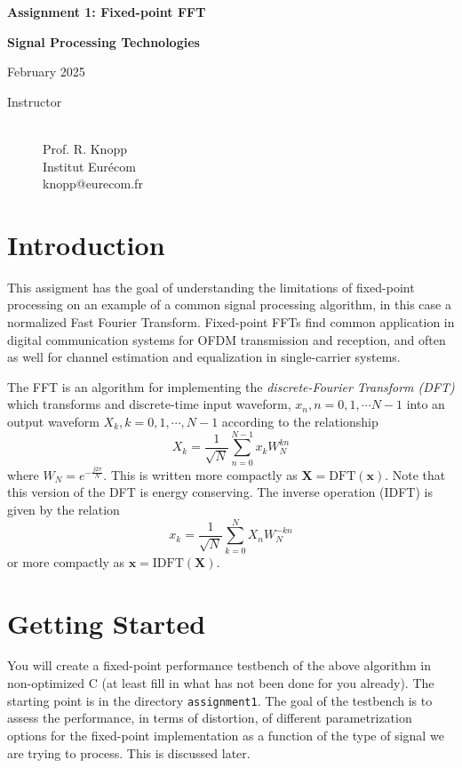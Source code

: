 \documentclass[11pt]{article}
\begin{document}
\parindent 0cm
\centerline{\Large\bf Assignment 1: Fixed-point FFT}
\centerline{\Large\bf Signal Processing Technologies}
\centerline{\large February 2025}
\makeatletter
\begin{description}
\item[Instructor] \mbox{}\\
Prof. R. Knopp\\
Institut Eur\'ecom\\
knopp@eurecom.fr
\end{description}
\section{Introduction}
This assigment has the goal of understanding the limitations of fixed-point processing on an 
example of a common signal processing algorithm, in this case a normalized Fast Fourier Transform.
Fixed-point FFTs find common application in digital communication systems for OFDM transmission and
reception, and often as well for channel estimation and equalization in single-carrier systems. 

The FFT is an algorithm for implementing the {\em discrete-Fourier Transform (DFT)} which transforms
and discrete-time input waveform, $x_{n}, n=0,1,\cdots N-1$ into an output waveform $X_{k}, k=0,1,\cdots,N-1$
according to the relationship
\begin{equation}
X_{k} = \frac{1}{\sqrt{N}}\sum_{n=0}^{N-1}x_{k}W_{N}^{kn}
\end{equation}
where $W_{N} = e^{-\frac{j2\pi}{N}}$.  This is written more compactly as $\mathbf{X} = \mathrm{DFT}(\mathbf{x})$. 
Note that this version of the DFT is energy conserving.  The inverse operation (IDFT) is given by the relation
\begin{equation}
x_{k} = \frac{1}{\sqrt{N}}\sum_{k=0}^{N}X_{n}W_{N}^{-kn}
\end{equation}
or more compactly as $\mathbf{x} = \mathrm{IDFT}(\mathbf{X})$.  

\section{Getting Started}

You will create a fixed-point performance testbench of the above algorithm in non-optimized C (at least fill in what
has not been done for you already). The starting point is in the directory {\tt assignment1}.  The goal of the testbench is to
assess the performance, in terms of distortion, of different parametrization options for the fixed-point implementation
as a function of the type of signal we are trying to process.  This is discussed later.  
\end{document}
